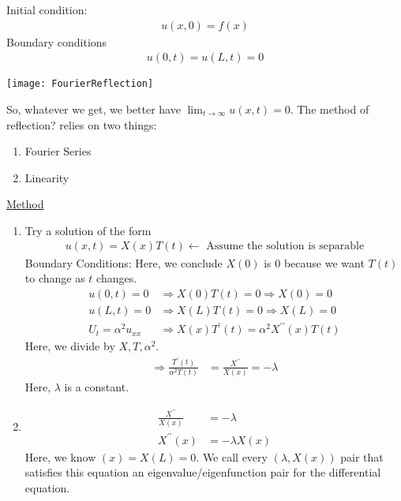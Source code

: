 Initial condition:
\begin{align}
  u(x, 0) = f(x)
\end{align}
Boundary conditions
\begin{align}
  u(0, t) = u(L, t) = 0
\end{align}
\begin{center}
  \texttt{[image: FourierReflection]}
\end{center}
So, whatever we get, we better have $\displaystyle \lim_{t \to \infty} u(x, t) = 0$. The method of reflection? relies on two things:
\begin{enumerate}
  \item Fourier Series
  \item Linearity
\end{enumerate}
\underline{Method}
\begin{enumerate}
  \item Try a solution of the form
  \begin{align}
    u(x, t) = X(x)T(t) \leftarrow \text{ Assume the solution is separable}
  \end{align}
  Boundary Conditions:
  Here, we conclude $X(0)$ is $0$ because we want $T(t)$ to change as $t$ changes.
  \begin{align}
    u(0, t) = 0 & \Rightarrow X(0)T(t) = 0 \Rightarrow X(0) = 0\\
    u(L, t) = 0 & \Rightarrow X(L)T(t) = 0 \Rightarrow X(L) = 0\\
    U_t = \alpha^2 u_{xx} & \Rightarrow X(x)T^\prime(t) = \alpha^2 X^{\prime\prime}(x) T(t)
  \end{align}
  Here, we divide by $X, T, \alpha^2$.
  \begin{align}
    \Rightarrow \frac{T^\prime(t)}{\alpha^2T(t)} & = \frac{X^{\prime\prime}}{X(x)} = -\lambda
  \end{align}
  Here, $\lambda$ is a constant.
  \item
  \begin{align}
    \frac{X^{\prime\prime}}{X(x)} & = -\lambda\\
    X^{\prime\prime}(x) & = -\lambda X(x)
  \end{align}
  Here, we know $(x) = X(L) = 0$. We call every $(\lambda, X(x))$ pair that satisfies this equation an eigenvalue/eigenfunction pair for the differential equation.


\end{enumerate}
